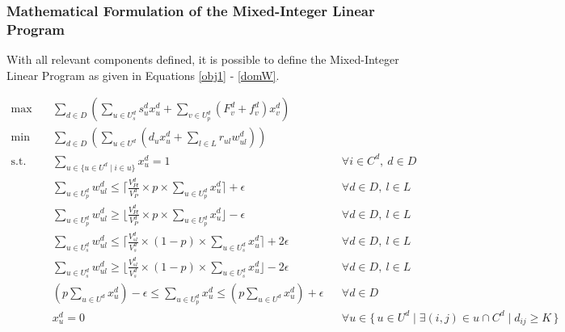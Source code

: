 \documentclass[11pt,twoside]{article}
\numberwithin{Theorem}{section}
\numberwithin{Definition}{section}
\numberwithin{Lemma}{section}
\numberwithin{Algorithm}{section}
\numberwithin{equation}{section}
\begin{document}
\subsubsection{Mathematical Formulation of the Mixed-Integer Linear Program}
With all relevant components defined, it is possible to define the Mixed-Integer Linear Program as given in Equations \eqref{obj1} - \eqref{domW}.
\begin{footnotesize}
\begin{align}
\max \quad
& \sum\nolimits_{d \in D} \left( \sum\nolimits_{u \in U_s^d}  s_u^d x_u^d + \sum\nolimits_{v \in U_p^d} (F_v^d + f_v^d) x_v^d  \right)
\label{obj1} \\
\min \quad
& \sum\nolimits_{d \in D} \left( \sum\nolimits_{u \in U^d} \left( d_u x_u^d + \sum\nolimits_{l \in L} r_{ul} w_{ul}^d \right) \right)
\label{obj2} \\
\text{s.t.}\quad
& \sum\nolimits_{u \in \{u \in U^d \mid i \in u \}} x_u^d = 1
&& \forall i \in C^d,\ d \in D \label{assignOnce} \\
& \sum\nolimits_{u \in U_p^d} w_{ul}^d \leq \lceil \tfrac{V_{Pl}^d}{V_P^d} \times p \times \sum\nolimits_{u \in U_p^d} x_u^d \rceil + \epsilon
&& \forall d \in D,\ l \in L \label{upperPairLocale} \\
& \sum\nolimits_{u \in U_p^d} w_{ul}^d \geq \lfloor \tfrac{V_{Pl}^d}{V_P^d} \times p \times \sum\nolimits_{u \in U_p^d} x_u^d \rfloor - \epsilon
&& \forall d \in D,\ l \in L \label{lowerPairLocale} \\
& \sum\nolimits_{u \in U_s^d} w_{ul}^d \leq \lceil \tfrac{V_{sl}^d}{V_s^d} \times (1 - p) \times \sum\nolimits_{u \in U_s^d} x_u^d \rceil + 2\epsilon
&& \forall d \in D,\ l \in L \label{upperSoloLocale} \\
& \sum\nolimits_{u \in U_s^d} w_{ul}^d \geq \lfloor \tfrac{V_{sl}^d}{V_s^d} \times (1 - p) \times \sum\nolimits_{u \in U_s^d} x_u^d \rfloor - 2 \epsilon
&& \forall d \in D,\ l \in L \label{lowerSoloLocale} \\
& \left( p \sum\nolimits_{u \in U^d} x_u^d \right) - \epsilon \leq \sum\nolimits_{u \in U_p^d} x_u^d \leq \left( p \sum\nolimits_{u \in U^d} x_u^d \right) + \epsilon
&& \forall d \in D \label{pairTolerance}\\
& x_u^d = 0 
&& \forall u \in \{\, u \in U^d \mid \exists (i,j) \in u \cap C^d \mid d_{ij} \ge K\,\} \label{pairDistLimit}\\

\end{align}
\end{footnotesize}
\end{document}
